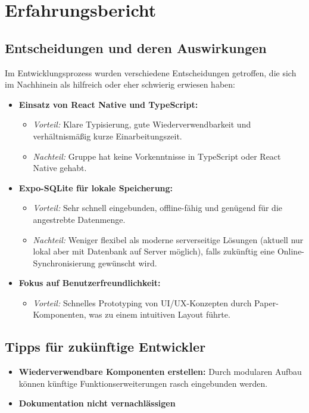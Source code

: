\documentclass[a4paper,12pt]{article}
\begin{document}
\section{Erfahrungsbericht}

\subsection{Entscheidungen und deren Auswirkungen}
Im Entwicklungsprozess wurden verschiedene Entscheidungen getroffen, die sich im Nachhinein als hilfreich oder eher schwierig erwiesen haben:

\begin{itemize}[leftmargin=1.5cm]
    \item \textbf{Einsatz von React Native und TypeScript:} 
    \begin{itemize}
        \item \textit{Vorteil:} Klare Typisierung, gute Wiederverwendbarkeit und verhältnismäßig kurze Einarbeitungszeit.   
        \item \textit{Nachteil:} Gruppe hat keine Vorkenntnisse in TypeScript oder React Native gehabt.
    \end{itemize}
    \item \textbf{Expo-SQLite für lokale Speicherung:}
    \begin{itemize}
        \item \textit{Vorteil:} Sehr schnell eingebunden, offline-fähig und genügend für die angestrebte Datenmenge.
        \item \textit{Nachteil:} Weniger flexibel als moderne serverseitige Lösungen (aktuell nur lokal aber mit Datenbank auf Server möglich), falls zukünftig eine Online-Synchronisierung gewünscht wird.
    \end{itemize}
    \item \textbf{Fokus auf Benutzerfreundlichkeit:}
    \begin{itemize}
        \item \textit{Vorteil:} Schnelles Prototyping von UI/UX-Konzepten durch Paper-Komponenten, was zu einem intuitiven Layout führte.
    \end{itemize}
\end{itemize}

\subsection{Tipps für zukünftige Entwickler}
\begin{itemize}[leftmargin=1.5cm]
    \item \textbf{Wiederverwendbare Komponenten erstellen:} Durch modularen Aufbau können künftige Funktionserweiterungen rasch eingebunden werden.
    \item \textbf{Dokumentation nicht vernachlässigen}
\end{itemize}
\end{document}
